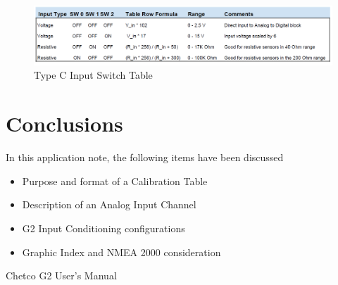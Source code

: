 \documentclass[12pt, letterpaper, twoside, titlepage]{article}
\begin{document}
\begin{figure}[hbt!]
  \includegraphics[width=\linewidth]{Switch Settings.png}
  \centering
  \caption{Type C Input Switch Table}
  \label{fig:Type C Switch Table}
\end{figure}

\section{Conclusions}
In this application note, the following items have been discussed

\begin{itemize}
\item Purpose and format of a Calibration Table \cite[Calibration Tables]{G2}
\item Description of an Analog Input Channel
\item G2 Input Conditioning configurations
\item Graphic Index and NMEA 2000 consideration
\end{itemize}

\begin{thebibliography}{9}
 Chetco G2 User's Manual
\end{thebibliography}
 
\end{document}
